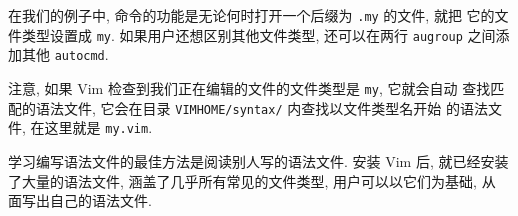 在我们的例子中, 命令的功能是无论何时打开一个后缀为 \texttt{.my} 的文件, 就把
它的文件类型设置成 \texttt{my}. 如果用户还想区别其他文件类型, 还可以在两行
\texttt{augroup} 之间添加其他 \texttt{autocmd}.

注意, 如果 Vim 检查到我们正在编辑的文件的文件类型是 \texttt{my}, 它就会自动
查找匹配的语法文件, 它会在目录 \texttt{VIMHOME/syntax/} 内查找以文件类型名开始
的语法文件, 在这里就是 \texttt{my.vim}.


\begin{warning}
    学习编写语法文件的最佳方法是阅读别人写的语法文件. 安装 Vim 后, 就已经安装
    了大量的语法文件, 涵盖了几乎所有常见的文件类型, 用户可以以它们为基础, 从
    面写出自己的语法文件.
\end{warning}

